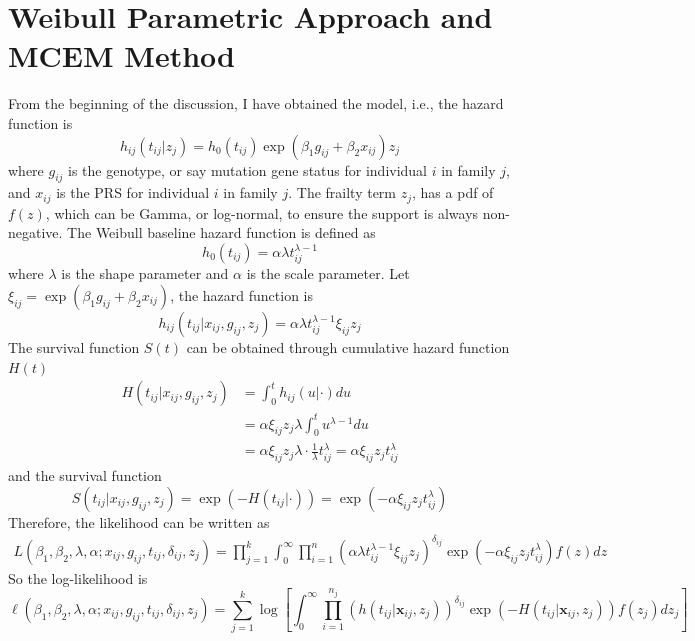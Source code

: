 \documentclass[preprint,12pt]{elsarticle}
\begin{document}
\section{Weibull Parametric Approach and MCEM Method}
From the beginning of the discussion, I have obtained the model, i.e., the hazard function is
\begin{equation}
    h_{ij}(t_{ij}|z_j)=h_0(t_{ij})\exp(\beta_1g_{ij}+\beta_2 x_{ij})z_j
\end{equation}
where $g_{ij}$ is the genotype, or say mutation gene status for individual $i$ in family $j$, and $x_{ij}$
is the PRS for individual $i$ in family $j$. The frailty term $z_j$, has a pdf of $f(z)$, which can be Gamma, or log-normal, 
to ensure the support is always non-negative. The Weibull baseline hazard function is defined as
\begin{equation}
    h_0(t_{ij})=\alpha\lambda t_{ij}^{\lambda-1}
\end{equation}
where $\lambda$ is the shape parameter and $\alpha$ is the scale parameter. Let $\xi_{ij}=\exp(\beta_1 g_{ij}+\beta_2 x_{ij})$, the hazard function is 
\begin{equation}
    h_{ij}(t_{ij}|x_{ij}, g_{ij}, z_j)=\alpha\lambda t_{ij}^{\lambda-1}\xi_{ij}z_j
\end{equation}
The survival function $S(t)$ can be obtained through cumulative hazard function $H(t)$
\begin{align}
    H(t_{ij}|x_{ij}, g_{ij}, z_j)&=\int_0^{t}h_{ij}(u|\cdot)du\\
    &=\alpha\xi_{ij}z_j\lambda\int_0^t u^{\lambda-1}du\\
    &=\alpha\xi_{ij}z_j\lambda\cdot \frac{1}{\lambda} t_{ij}^{\lambda}=\alpha\xi_{ij}z_j t_{ij}^{\lambda}
\end{align}
and the survival function
\begin{equation}
    S(t_{ij}|x_{ij}, g_{ij}, z_j)=\exp(-H(t_{ij}|\cdot))=\exp(-\alpha\xi_{ij}z_j t_{ij}^{\lambda})
\end{equation}
Therefore, the likelihood can be written as
\begin{align}
    L(\beta_1, \beta_2, \lambda, \alpha; x_{ij}, g_{ij}, t_{ij}, \delta_{ij}, z_j)=\prod_{j=1}^k\int_0^{\infty}\prod_{i=1}^{n}(\alpha\lambda t_{ij}^{\lambda-1}\xi_{ij}z_j)^{\delta_{ij}}\exp(-\alpha\xi_{ij}z_j t_{ij}^{\lambda})f(z)dz
\end{align}
So the log-likelihood is 
\begin{equation}\label{eq:logllhd}
    \ell(\beta_1, \beta_2, \lambda, \alpha; x_{ij}, g_{ij}, t_{ij}, \delta_{ij}, z_j)=\sum_{j=1}^k\log \left [ \int_0^{\infty}\prod_{i=1}^{n_j}(h(t_{ij}|\mathbf{x}_{ij}, z_j))^{\delta_{ij}}\exp (-H(t_{ij}|\mathbf{x}_{ij}, z_j))f(z_j)dz_j\right ]
\end{equation}
\end{document}
